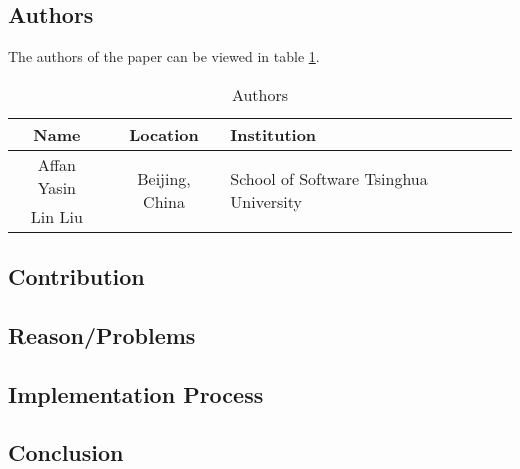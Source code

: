\clearpage
\section*{\citet{2016_Yasin}}

\subsection*{Authors}
The authors of the paper can be viewed in table \ref{tab:2016_Yasin_Authors}.
\begin{longtable}{ |c|c|p{5cm}| }
	\caption{Authors} \label{tab:2016_Yasin_Authors} \\
	\hline
 	\cellcolor{Gray}Name & \cellcolor{Gray}Location & \cellcolor{Gray}Institution \\ [0.5ex] 
 	\hline\hline
 	\endhead
 	Affan Yasin & \multirow{2}{*}{\parbox{5cm}{\centering Beijing, China}}  & \multirow{2}{*}{\parbox{5cm}{\centering School of Software Tsinghua University}} \\
	\cline{1-1}
	 Lin Liu &  & \\
	 \hline
\end{longtable}


\subsection*{Contribution}



\subsection*{Reason/Problems}



\subsection*{Implementation Process}


\subsection*{Conclusion}

